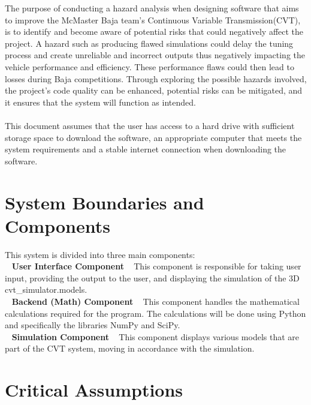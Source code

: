 \documentclass{article}
\begin{document}
The purpose of conducting a hazard analysis when designing software that aims to improve the
McMaster Baja team's Continuous Variable Transmission(CVT), is to identify and become aware of potential risks that could negatively affect the project. 
A hazard such as producing flawed simulations could delay the tuning process and create unreliable and incorrect outputs thus negatively impacting the vehicle performance and efficiency. 
These performance flaws could then lead to losses during Baja competitions. 
Through exploring the possible hazards involved, the project's code quality can be enhanced, potential risks can be mitigated, and it ensures that the system will function as intended. 
\\\\
\noindent This document assumes that the user has access to a hard drive with sufficient storage space to download the software, an appropriate computer that meets the system requirements and a stable internet connection when downloading the software. 

\section{System Boundaries and Components}

This system is divided into three main components:\\
~\newline
\textbf{User Interface Component}  
~\newline
This component is responsible for taking user input, providing the output to the user, and displaying the simulation of the 3D cvt_simulator.models.\\
~\newline
\textbf{Backend (Math) Component}  
~\newline
This component handles the mathematical calculations required for the program. The calculations will be done using Python and specifically the libraries NumPy and SciPy.\\
~\newline
\textbf{Simulation Component}  
~\newline
This component displays various models that are part of the CVT system, moving in accordance with the simulation.\\

\section{Critical Assumptions}
\end{document}
